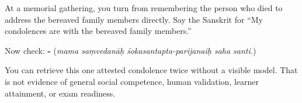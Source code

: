At a memorial gathering, you turn from remembering the person who died to address the bereaved family members directly. Say the Sanskrit for “My condolences are with the bereaved family members.”

\begin{grammarlens}[title={What you've built: check after answering}]
Now check: \textbf{  -  } (\emph{mama saṃvedanāḥ śokasantapta-parijanaiḥ saha santi.})
\end{grammarlens}

\begin{tcolorbox}[breakable,colback=teal!4,colframe=teal!35!black,title={Before you move on}]
You can retrieve this one attested condolence twice without a visible model. That is not evidence of general social competence, human validation, learner attainment, or exam readiness.
\end{tcolorbox}

